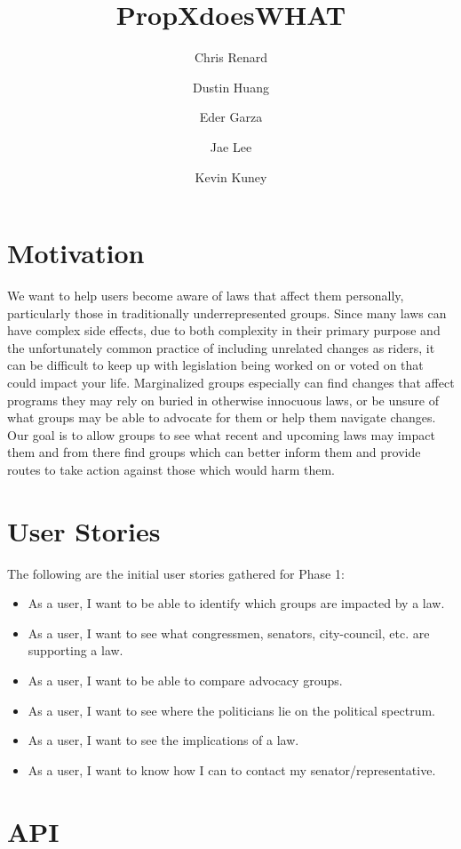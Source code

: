 \documentclass[12pt]{article}
\title{PropXdoesWHAT}
\author{Chris Renard \and Dustin Huang \and Eder Garza \and Jae Lee \and Kevin Kuney}
\date{} %
\begin{document}
\maketitle

\section{Motivation}

We want to help users become aware of laws that affect them personally, particularly those in traditionally underrepresented groups. 
Since many laws can have complex side effects, due to both complexity in their primary purpose and the unfortunately common practice of including unrelated changes as riders, it can be difficult to keep up with legislation being worked on or voted on that could impact your life.
Marginalized groups especially can find changes that affect programs they may rely on buried in otherwise innocuous laws, or be unsure of what groups may be able to advocate for them or help them navigate changes.
Our goal is to allow groups to see what recent and upcoming laws may impact them and from there find groups which can better inform them and provide routes to take action against those which would harm them.


\section{User Stories}

The following are the initial user stories gathered for Phase 1: \\

\begin{itemize}
	\item As a user, I want to be able to identify which groups are impacted by a law.
	\item As a user, I want to see what congressmen, senators, city-council, etc. are supporting a law.
	\item As a user, I want to be able to compare advocacy groups.
	\item As a user, I want to see where the politicians lie on the political spectrum.
	\item As a user, I want to see the implications of a law.
	\item As a user, I want to know how I can to contact my senator/representative.
\end{itemize}

\section{API}
\end{document}
